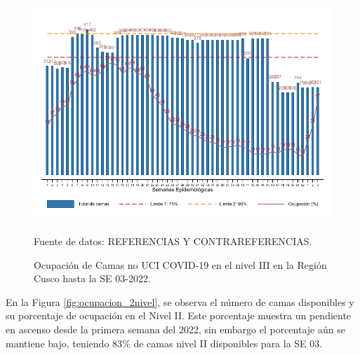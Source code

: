 \documentclass[12pt,a4paper,openany]{book}
\begin{document}
\begin{figure}[htpb]
	\caption{Ocupación de Camas no UCI COVID-19 en el nivel III en la Región Cusco hasta la SE 03-2022.}\label{fig:ocupacion_3_nivel}
	\begin{center}
		\includegraphics[width=0.95\linewidth]{../figuras/nivel_3.pdf}
	\end{center}
	{\footnotesize {Fuente de datos: REFERENCIAS Y CONTRAREFERENCIAS.}}
\end{figure}

\clearpage

En la Figura \ref{fig:ocupacion_2nivel}, se observa el número de camas disponibles y su porcentaje de ocupación en el Nivel II. Este porcentaje muestra un pendiente en ascenso desde la primera semana del 2022, sin embargo el porcentaje aún se mantiene bajo, teniendo 83$\%$ de camas nivel II disponibles para la SE 03.   
\end{document}
